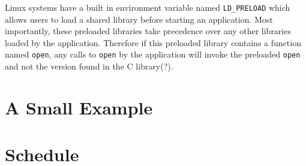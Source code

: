 \documentclass[10pt]{article}
\begin{document}
Linux systems have a built in environment variable named \texttt{LD\_PRELOAD} which allows users to load a shared library before starting an application. Most importantly, these preloaded libraries take precedence over any other libraries loaded by the application. Therefore if this preloaded library contains a function named \texttt{open}, any calls to \texttt{open} by the application will invoke the preloaded \texttt{open} and not the version found in the C library(?).

\section{A Small Example}

\section{Schedule}
\end{document}
